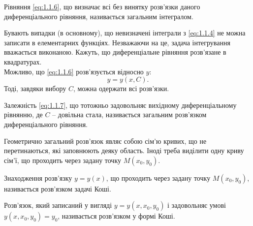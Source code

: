 \begin{definition}
	Рівняння \eqref{eq:1.1.6}, що визначає всі без винятку розв’язки даного диференціального рівняння, називається загальним інтегралом.
\end{definition}

Бувають випадки (в основному), що невизначені інтеграли з \eqref{eq:1.1.4} не можна записати в елементарних функціях. Незважаючи на це, задача інтегрування вважається виконаною. Кажуть, що диференціальне рівняння розв’язане в квадратурах. \\

Можливо, що \eqref{eq:1.1.6} розв’язується відносно $y$: 
\begin{equation}
	\label{eq:1.1.7}
	y = y(x, C).
\end{equation} Тоді, завдяки вибору $C$, можна одержати всі розв’язки. 

\begin{definition}
	Залежність \eqref{eq:1.1.7}, що тотожньо задовольняє вихідному диференціальному рівнянню, де $C$ -- довільна стала, називається загальним розв’язком диференціального рівняння.
\end{definition}

Геометрично загальний розв’язок являє собою сім’ю кривих, що не перетинаються, які заповнюють деяку область. Іноді треба виділити одну криву сім’ї, що проходить через задану точку $M(x_0, y_0)$.

\begin{definition}
	Знаходження розв’язку $y = y(x)$, що проходить через задану точку $M(x_0, y_0)$, називається розв’язком задачі Коші.
\end{definition}

\begin{definition}
	Розв’язок, який записаний у вигляді $y = y(x, x_0, y_0)$ і задовольняє умові $y(x, x_0, y_0) = y_0$, називається розв’язком у формі Коші.
\end{definition}
